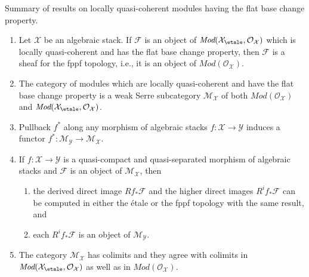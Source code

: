 \begin{proposition}
\label{proposition-lcq-flat-base-change}
Summary of results on locally quasi-coherent modules having the flat
base change property.
\begin{enumerate}
\item Let $\mathcal{X}$ be an algebraic stack.
If $\mathcal{F}$ is an object of
$\textit{Mod}(\mathcal{X}_\etale, \mathcal{O}_\mathcal{X})$
which is locally quasi-coherent and has the flat base change property,
then $\mathcal{F}$ is a sheaf for the fppf topology, i.e., it is
an object of $\textit{Mod}(\mathcal{O}_\mathcal{X})$.
\item The category of modules which are locally quasi-coherent
and have the flat base change property is a weak Serre subcategory
$\mathcal{M}_\mathcal{X}$ of both $\textit{Mod}(\mathcal{O}_\mathcal{X})$
and $\textit{Mod}(\mathcal{X}_\etale, \mathcal{O}_\mathcal{X})$.
\item Pullback $f^*$ along any morphism of algebraic stacks
$f : \mathcal{X} \to \mathcal{Y}$ induces a functor
$f^* : \mathcal{M}_\mathcal{Y} \to \mathcal{M}_\mathcal{X}$.
\item If $f : \mathcal{X} \to \mathcal{Y}$ is a
quasi-compact and quasi-separated morphism of algebraic stacks
and $\mathcal{F}$ is an object of $\mathcal{M}_\mathcal{X}$, then
\begin{enumerate}
\item the derived direct image $Rf_*\mathcal{F}$ and the higher direct
images $R^if_*\mathcal{F}$ can be computed in either the \'etale or the
fppf topology with the same result, and
\item each $R^if_*\mathcal{F}$ is an object of $\mathcal{M}_\mathcal{Y}$.
\end{enumerate}
\item The category $\mathcal{M}_\mathcal{X}$ has colimits and they agree
with colimits in
$\textit{Mod}(\mathcal{X}_\etale, \mathcal{O}_\mathcal{X})$
as well as in $\textit{Mod}(\mathcal{O}_\mathcal{X})$.
\end{enumerate}
\end{proposition}


